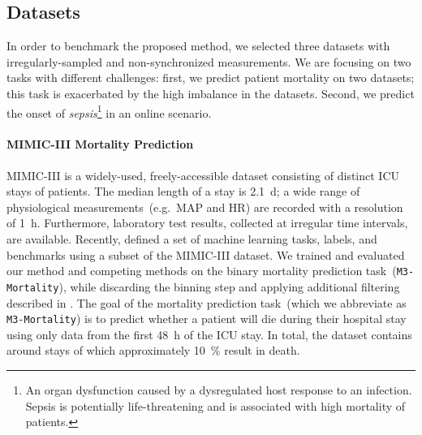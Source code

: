 \documentclass{article}
\newcommand{\dataset}[1]{\texttt{#1}}
\begin{document}
\subsection{Datasets}

In order to benchmark the proposed method, we selected three datasets
with irregularly-sampled and non-synchronized measurements. We are
focusing on two tasks with different challenges: first, we predict
patient mortality on two datasets; this task is exacerbated by the high
imbalance in the datasets. Second, we predict the onset of
\emph{sepsis}\footnote{An organ dysfunction caused by a dysregulated
host response to an infection. Sepsis is potentially life-threatening
and is associated with high mortality of patients.} in an online
scenario.

\paragraph{MIMIC-III Mortality Prediction}
MIMIC-III \citep{johnson2016mimic} is a widely-used, freely-accessible
dataset consisting of distinct ICU stays of patients. The median length
of a stay is \SI{2.1}{\day}; a wide range of physiological
measurements~(e.g.\ MAP and HR) are recorded with a resolution of
\SI{1}{\hour}.
Furthermore, laboratory test results, collected at irregular time
intervals, are available.
Recently, \citet{Harutyunyan2019} defined a set of machine learning tasks,
labels, and benchmarks using a subset of the MIMIC-III dataset.
We trained and evaluated our method and competing methods on the binary
mortality prediction task~(\dataset{M3-Mortality}), while discarding the
binning step and applying additional filtering
described in .
The goal of the mortality prediction task~(which we abbreviate as
\dataset{M3-Mortality}) is to predict whether
a patient will die during their hospital stay using only data from the
first \SI{48}{\hour} of the ICU stay. In total, the dataset contains
around  stays of which approximately \SI{10}{\percent} result in
death.
\end{document}
